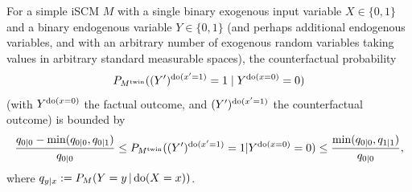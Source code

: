 \begin{Prp}\label{prp:Bounding_counterfactuals}
  For a simple iSCM $M$ with a single binary exogenous input variable $X \in \{0,1\}$ and a binary endogenous variable $Y \in \{0,1\}$
  (and perhaps additional endogenous variables, and with an arbitrary number of exogenous random variables taking values in arbitrary
  standard measurable spaces), the counterfactual probability
  $$P_{M^{\mathrm{twin}}}((Y')^{\operatorname{do}(x'=1)}=1\mid Y^{\operatorname{do}(x=0)}=0)$$
  (with $Y^{\operatorname{do}(x=0)}$ the factual outcome, and $(Y')^{\operatorname{do}(x'=1)}$ the counterfactual outcome)
  is bounded by
$$\frac{q_{0|0} - \min(q_{0|0},q_{0|1})}{q_{0|0}} \le P_{M^{\mathrm{twin}}}((Y')^{\operatorname{do}(x'=1)} = 1 | Y^{\operatorname{do}(x=0)}=0) \le \frac{\min(q_{0|0},q_{1|1})}{q_{0|0}},$$
  where
  $q_{y|x} := P_M(Y=y\operatorname*{|} \operatorname{do}(X=x))$.
\end{Prp}
